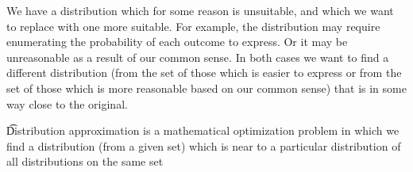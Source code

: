 

We have a distribution which for some reason is unsuitable, and which we want to replace with one more suitable.
For example, the distribution may require enumerating the probability of each outcome to express.
Or it may be unreasonable as a result of our common sense.
In both cases we want to find a different distribution (from the set of those which is easier to express or from the set of those which is more reasonable based on our common sense) that is in some way close to the original.


\t{Distribution approximation} is a mathematical optimization problem in which we find a distribution (from a given set) which is near to a particular distribution  of all distributions on the same set

